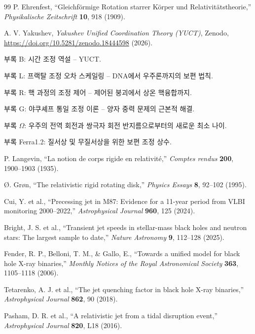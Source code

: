 \documentclass[12pt,a4paper]{article}
\begin{document}
	\begin{thebibliography}{99}
		P. Ehrenfest, ``Gleichf{\"o}rmige Rotation starrer K{\"o}rper und Relativit{\"a}tstheorie,'' \emph{Physikalische Zeitschrift} \textbf{10}, 918 (1909).
		
		A. V. Yakushev, \emph{Yakushev Unified Coordination Theory (YUCT)}, Zenodo, \url{https://doi.org/10.5281/zenodo.18444598} (2026).
		
		부록 B: 시간 조정 역설 -- YUCT.
		
		부록 L: 프랙탈 조정 오차 스케일링 -- DNA에서 우주론까지의 보편 법칙.
		
		부록 R: 핵 과정의 조정 제어 -- 제어된 붕괴에서 상온 핵융합까지.
		
		부록 G: 야쿠셰프 통일 조정 이론 -- 양자 중력 문제의 근본적 해결.
		
		부록 \(\Omega\): 우주의 전역 회전과 쌍극자 회전 반지름으로부터의 새로운 최소 나이.
		
		부록 Ferra1.2: 질서상 및 무질서상을 위한 보편 조정 상수.
		
		P. Langevin, ``La notion de corps rigide en relativit{\'e},'' \emph{Comptes rendus} \textbf{200}, 1900--1903 (1935).
		
		{\O}. Gr{\o}n, ``The relativistic rigid rotating disk,'' \emph{Physics Essays} \textbf{8}, 92--102 (1995).
		
		Cui, Y. et al., ``Precessing jet in M87: Evidence for a 11-year period from VLBI monitoring 2000–2022,'' \emph{Astrophysical Journal} \textbf{960}, 125 (2024).
		
		Bright, J. S. et al., ``Transient jet speeds in stellar-mass black holes and neutron stars: The largest sample to date,'' \emph{Nature Astronomy} \textbf{9}, 112–128 (2025).
		
		Fender, R. P., Belloni, T. M., \& Gallo, E., ``Towards a unified model for black hole X-ray binaries,'' \emph{Monthly Notices of the Royal Astronomical Society} \textbf{363}, 1105–1118 (2006).
		
		Tetarenko, A. J. et al., ``The jet quenching factor in black hole X-ray binaries,'' \emph{Astrophysical Journal} \textbf{862}, 90 (2018).
		
		Pasham, D. R. et al., ``A relativistic jet from a tidal disruption event,'' \emph{Astrophysical Journal} \textbf{820}, L18 (2016).
		

\end{thebibliography}
\end{document}
